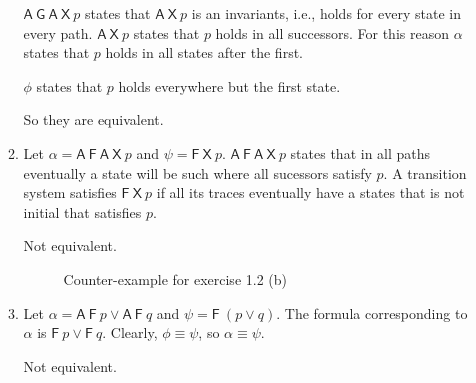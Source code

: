\documentclass[12pt]{article}
\begin{document}
\begin{enumerate}[label=\roman*.]
\begin{enumerate}[label=(\alph*)]
    $\mathsf{A}~\mathsf{G}~\mathsf{A}~\mathsf{X}~p$ states that $\mathsf{A}~\mathsf{X}~p$ is an invariants, i.e., holds for every state in every path.
    $\mathsf{A}~\mathsf{X}~p$ states that $p$ holds in all successors.
    For this reason $\alpha$ states that $p$ holds in all states after the first.

    $\phi$ states that $p$ holds everywhere but the first state.

    So they are equivalent.

  \item Let $\alpha = \mathsf{A}~\mathsf{F}~\mathsf{A}~\mathsf{X}~p$ and $\psi = \mathsf{F}~\mathsf{X}~p$.
    $\mathsf{A}~\mathsf{F}~\mathsf{A}~\mathsf{X}~p$ states that in all paths eventually a state will be such where all sucessors satisfy $p$.
    A transition system satisfies $\mathsf{F}~\mathsf{X}~p$ if all its traces eventually have a states that is not initial that satisfies $p$.

    Not equivalent.

    \begin{figure}[ht]
      \centering
      \caption{Counter-example for exercise 1.2 (b)}
      \label{fig:1-2-b}
    \end{figure}

  \item Let $\alpha = \mathsf{A}~\mathsf{F}~p \vee \mathsf{A}~\mathsf{F}~q$ and $\psi = \mathsf{F}~(p \vee q)$.
    The formula corresponding to $\alpha$ is $\mathsf{F}~p \vee \mathsf{F}~q$.
    Clearly, $\phi \equiv \psi$, so $\alpha \equiv \psi$.

    Not equivalent.

    \begin{figure}[ht]
      \centering
\end{figure}
\end{enumerate}
\end{enumerate}
\end{document}
